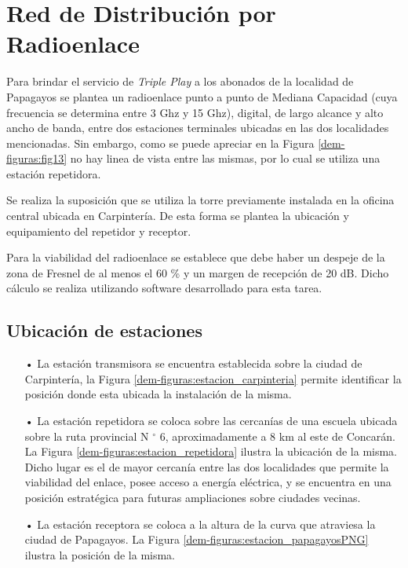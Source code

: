 \section{Red de Distribución por Radioenlace}


Para brindar el servicio de \textit{Triple Play} a los abonados de la localidad de Papagayos se plantea un radioenlace punto a punto de Mediana Capacidad (cuya frecuencia se determina entre 3 Ghz y 15 Ghz), digital, de largo alcance y alto ancho de banda, entre dos estaciones terminales ubicadas en las dos localidades mencionadas. Sin embargo, como se puede apreciar en la Figura \ref{dem-figuras:fig13} no hay linea de vista entre las mismas, por lo cual se utiliza una estación repetidora.


Se realiza la suposición que se utiliza la torre previamente instalada en la oficina central ubicada en Carpintería. De esta forma se plantea la ubicación y equipamiento del repetidor y receptor.


Para la viabilidad del radioenlace se establece que debe haber un despeje de la zona de Fresnel de al menos el 60 \% y un margen de recepción de 20 dB. Dicho cálculo se realiza utilizando software desarrollado para esta tarea.


\subsection{Ubicación de estaciones}

\begin{enumerate}
\item[•]La estación transmisora se encuentra establecida sobre la ciudad de Carpintería, la Figura \ref{dem-figuras:estacion_carpinteria} permite identificar la posición donde esta ubicada la instalación de la misma.


\item[•]La estación repetidora se coloca sobre las cercanías de una escuela ubicada sobre la ruta provincial N $^{\circ}$ 6, aproximadamente a 8 km al este de Concarán. La Figura \ref{dem-figuras:estacion_repetidora} ilustra la ubicación de la misma.
Dicho lugar es el de mayor cercanía entre las dos localidades que permite la viabilidad del enlace, posee acceso a energía eléctrica, y se encuentra en una posición estratégica para futuras ampliaciones sobre ciudades vecinas.



\item[•]La estación receptora se coloca a la altura de la curva que atraviesa la ciudad de Papagayos. La Figura \ref{dem-figuras:estacion_papagayosPNG} ilustra la posición de la misma.


\end{enumerate}

